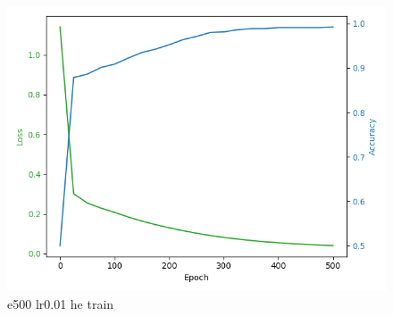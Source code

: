 \documentclass[8pt]{article}
\begin{document}
\begin{figure}[H]
    \begin{minipage}{0.32\textwidth}
        \centering
        \includegraphics[width=\textwidth]{../Prob4/out/1024_173617/e500_lr0.01_btz16_he/training_process.png}
        \caption{e500 lr0.01 he train}
        \label{fig:e500 lr0.01 he train}
    \end{minipage}
\end{figure}
\end{document}
